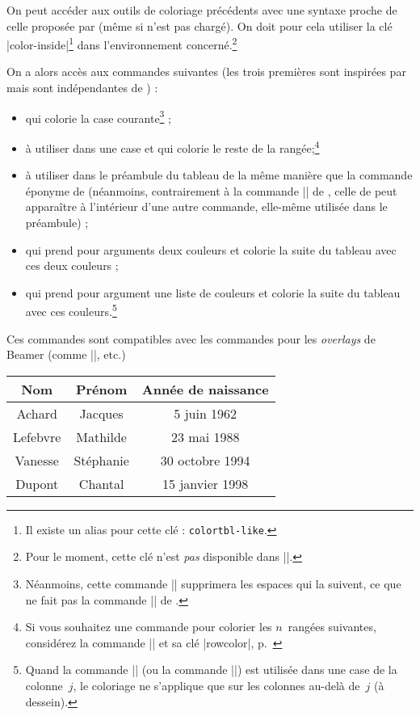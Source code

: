 \documentclass[dvipsnames]{article}%
\begin{document}
On peut accéder aux outils de coloriage précédents avec une syntaxe proche de
celle proposée par  (même si  n'est pas chargé). On
doit pour cela utiliser la clé |color-inside|\footnote{Il existe un alias pour
  cette clé : \texttt{colortbl-like}.} dans l'environnement
concerné.\footnote{Pour le moment, cette clé n'est \emph{pas} disponible dans
  |\NiceMatrixOptions|.}

On a alors accès aux commandes suivantes (les trois premières sont inspirées par
 mais sont indépendantes de ) :
\begin{itemize}
\item {} qui colorie la case courante\footnote{Néanmoins, cette
  commande |\cellcolor| supprimera les espaces qui la suivent, ce que ne fait
  pas la commande |\cellcolor| de .} ;
\item {} à utiliser dans une case et qui colorie le
reste de la rangée;\footnote{Si vous souhaitez une commande pour colorier les
  $n$~rangées suivantes, considérez la commande |\RowStyle| et sa clé
  |rowcolor|, p.~\pageref{RowStyle}} 
\item {} à utiliser dans le préambule du tableau
de la même manière que la commande éponyme de  (néanmoins,
contrairement à la commande |\columncolor| de , celle de
 peut apparaître à l'intérieur d'une autre commande, elle-même
utilisée dans le préambule) ;
\item {} qui prend pour arguments deux couleurs et
colorie la suite du tableau avec ces deux couleurs ;
\item {} qui prend pour argument une liste de
couleurs et colorie la suite du tableau avec ces couleurs.\footnote{Quand la
  commande |\rowlistcolors| (ou la commande |\rowcolors|) est utilisée dans une
  case de la colonne~$j$, le coloriage ne s'applique que sur les colonnes
  au-delà de~$j$ (à dessein).}
\end{itemize}
Ces commandes sont compatibles avec les commandes pour les \emph{overlays} de
Beamer (comme |\only|, etc.)

\medskip
\begin{Code}
\NewDocumentCommand { \Blue } { } {\emph{}}
\begin{NiceTabular}{>{\Blue}c>{\Blue}cc}
\toprule
\emph{}
Nom & Prénom & Année de naissance \\
\midrule
Achard & Jacques & 5 juin 1962 \\
Lefebvre & Mathilde & 23 mai 1988 \\
Vanesse & Stéphanie & 30 octobre 1994 \\
Dupont & Chantal & 15 janvier 1998 \\
\bottomrule
\end{NiceTabular}
\end{Code}
\end{document}

